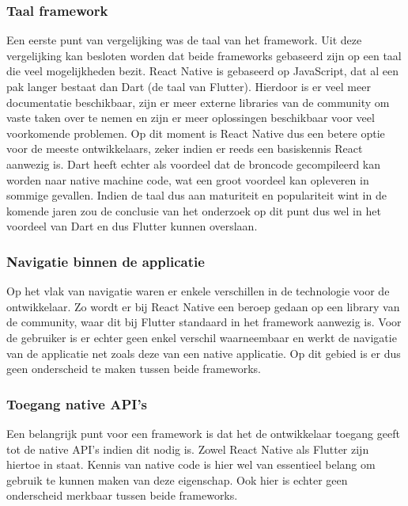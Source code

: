 \subsubsection{Taal framework}

Een eerste punt van vergelijking was de taal van het framework. Uit deze vergelijking kan besloten worden dat beide frameworks gebaseerd zijn op een taal die veel mogelijkheden bezit. React Native is gebaseerd op JavaScript, dat al een pak langer bestaat dan Dart (de taal van Flutter). Hierdoor is er veel meer documentatie beschikbaar, zijn er meer externe libraries van de community om vaste taken over te nemen en zijn er meer oplossingen beschikbaar voor veel voorkomende problemen. Op dit moment is React Native dus een betere optie voor de meeste ontwikkelaars, zeker indien er reeds een basiskennis React aanwezig is. Dart heeft echter als voordeel dat de broncode gecompileerd kan worden naar native machine code, wat een groot voordeel kan opleveren in sommige gevallen. Indien de taal dus aan maturiteit en populariteit wint in de komende jaren zou de conclusie van het onderzoek op dit punt dus wel in het voordeel van Dart en dus Flutter kunnen overslaan.

\subsubsection{Navigatie binnen de applicatie}

Op het vlak van navigatie waren er enkele verschillen in de technologie voor de ontwikkelaar. Zo wordt er bij React Native een beroep gedaan op een library van de community, waar dit bij Flutter standaard in het framework aanwezig is. Voor de gebruiker is er echter geen enkel verschil waarneembaar en werkt de navigatie van de applicatie net zoals deze van een native applicatie. Op dit gebied is er dus geen onderscheid te maken tussen beide frameworks.

\subsubsection{Toegang native API's}

Een belangrijk punt voor een framework is dat het de ontwikkelaar toegang geeft tot de native API's indien dit nodig is. Zowel React Native als Flutter zijn hiertoe in staat. Kennis van native code is hier wel van essentieel belang om gebruik te kunnen maken van deze eigenschap. Ook hier is echter geen onderscheid merkbaar tussen beide frameworks.

